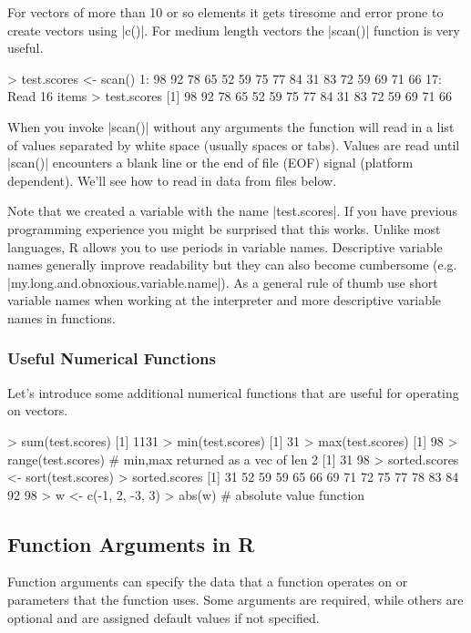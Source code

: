 For vectors of more than 10 or so elements it gets tiresome and error
prone to create vectors using |c()|. For medium length vectors
the |scan()| function is very useful.
%
\begin{R}
> test.scores <- scan()
1: 98 92 78 65 52 59 75 77 84 31 83 72 59 69 71 66
17:
Read 16 items
> test.scores
 [1] 98 92 78 65 52 59 75 77 84 31 83 72 59 69 71 66
\end{R}
%
When you invoke |scan()| without any arguments the function
will read in a list of values separated by white space (usually spaces
or tabs). Values are read until |scan()| encounters a blank
line or the end of file (EOF) signal (platform dependent). We'll see how to read in data from files below.

Note that we created a variable with the name |test.scores|.
If you have previous programming experience you might be surprised that
this works. Unlike most languages, R allows you to use periods in
variable names. Descriptive variable names generally improve readability
but they can also become cumbersome (e.g.
|my.long.and.obnoxious.variable.name|). As a general rule of
thumb use short variable names when working at the interpreter and more
descriptive variable names in functions.

\subsubsection{Useful Numerical Functions}

Let's introduce some additional numerical functions that are useful for
operating on vectors.
%
\begin{R}
> sum(test.scores)
[1] 1131
> min(test.scores)
[1] 31
> max(test.scores)
[1] 98
> range(test.scores) # min,max returned as a vec of len 2
[1] 31 98
> sorted.scores <- sort(test.scores)
> sorted.scores
 [1] 31 52 59 59 65 66 69 71 72 75 77 78 83 84 92 98
> w <- c(-1, 2, -3, 3)
> abs(w) # absolute value function
\end{R}

\subsection{Function Arguments in R}

Function arguments can specify the data that a function operates on or
parameters that the function uses. Some arguments are required, while
others are optional and are assigned default values if not specified.

